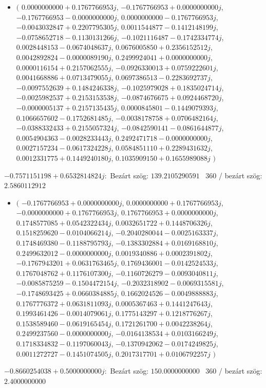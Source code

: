 \documentclass[14pt,a4paper]{article}
\begin{document}
\begin{itemize}
\item
$\big($
$0.0000000000+0.1767766953j$, $-0.1767766953+0.0000000000j$, $-0.1767766953-0.0000000000j$, $0.0000000000-0.1767766953j$, $-0.0043032847+0.2207795305j$, $0.0011544877-0.1412148199j$, $-0.0758652718-0.1130131266j$, $-0.1021116487-0.1742334774j$, $0.0028448153-0.0674048637j$, $0.0676005850+0.2356152512j$, $0.0042892824-0.0000089190j$, $0.2499924041+0.0000000000j$, $0.0000116154+0.2157062555j$, $-0.0926330013+0.0759222601j$, $0.0041668886+0.0713479055j$, $0.0697386513-0.2283692737j$, $-0.0097552639+0.1484246338j$, $-0.1025979028+0.1835024714j$, $-0.0025982537+0.2153153538j$, $-0.0874676675+0.0924468720j$, $-0.0000005137+0.2157135435j$, $0.0000845801-0.1449079393j$, $0.1066657602-0.1752681485j$, $-0.0038178758+0.0706482164j$, $-0.0388332433+0.2155057324j$, $-0.0842590141-0.0861644877j$, $0.0054904363-0.0028233443j$, $0.2492471718-0.0000000000j$, $0.0027157234-0.0617324228j$, $0.0584851110+0.2289431632j$, $0.0012331775+0.1449240180j$, $0.1035909150+0.1655989088j$
$\big)$
\end{itemize}
$-0.7571151198+0.6532814824j$:\
Bezárt szög: $139.2105290591$ \
360 / bezárt szög: $2.5860112912$\
\begin{itemize}
\item
$\big($
$-0.1767766953+0.0000000000j$, $0.0000000000+0.1767766953j$, $-0.0000000000+0.1767766953j$, $0.1767766953+0.0000000000j$, $0.1748577085+0.0542322434j$, $0.0032651722+0.1448706326j$, $0.1518259620-0.0104066214j$, $-0.2040280044-0.0025163337j$, $0.1748469380-0.1188795793j$, $-0.1383302884+0.0169168810j$, $0.2499632012-0.0000000000j$, $0.0019340886+0.0002391802j$, $-0.1767943201+0.0631763465j$, $0.1769436001-0.0142524533j$, $0.1767048762+0.1176107300j$, $-0.1160726279-0.0093040811j$, $-0.0085875259-0.1504472154j$, $-0.2032318902-0.0069315581j$, $-0.1748693425+0.0660384885j$, $0.1662024526-0.0049888883j$, $0.1767776372+0.0631811093j$, $0.0005367463+0.1441247643j$, $0.1993461426-0.0014079061j$, $0.1775143297+0.1218776267j$, $0.1538589460-0.0619165454j$, $0.1721261700+0.0042238264j$, $0.2499237560-0.0000000000j$, $-0.0164138534+0.0103166249j$, $0.1718334832-0.1197060043j$, $-0.1370942062-0.0174249825j$, $0.0011272727-0.1451074505j$, $0.2017317701+0.0106792257j$
$\big)$
\end{itemize}
$-0.8660254038+0.5000000000j$:\
Bezárt szög: $150.0000000000$ \
360 / bezárt szög: $2.4000000000$\
\end{document}
